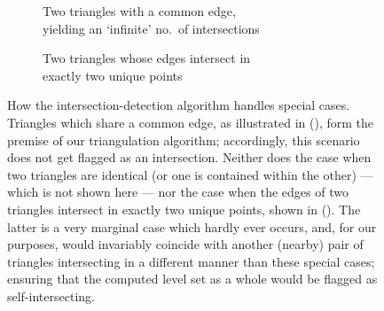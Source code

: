\begin{figure}[htpb]
    \centering
    \begin{subfigure}[b]{0.45\textwidth}
        \centering
        \resizebox{0.9\textwidth}{!}{}
        \caption[]{Two triangles with a common edge,\\\phantom{(a) } yielding
        an `infinite' no.\ of intersections}
        \label{fig:mollertrumbore_vertexshared}
    \end{subfigure}
    \begin{subfigure}[b]{0.45\textwidth}
        \centering
        \resizebox{0.9\textwidth}{!}{}
        \caption[]{Two triangles whose edges intersect in\\\phantom{(b) } exactly
            two unique points
        }
        \label{fig:mollertrumbore_dualisect}
    \end{subfigure}
    \caption[How the intersection-detection algorithm handles special cases]
    {How the intersection-detection algorithm handles special cases.
        Triangles which share a common edge, as illustrated in
        (), form the premise of our
        triangulation algorithm; accordingly, this scenario does not get flagged
        as an intersection. Neither does the case when two triangles are
        identical (or one is contained within the other) --- which is not shown
        here --- nor the case when the edges of two triangles intersect in
        exactly two unique points, shown in
        (). The latter is a very marginal
        case which hardly ever occurs, and, for our purposes, would invariably
        coincide with another (nearby) pair of triangles intersecting in a
        different manner than these special cases; ensuring that the computed
        level set as a whole would be flagged as self-intersecting.}
    \label{fig:mollertrumbore_specialcases}
\end{figure}

